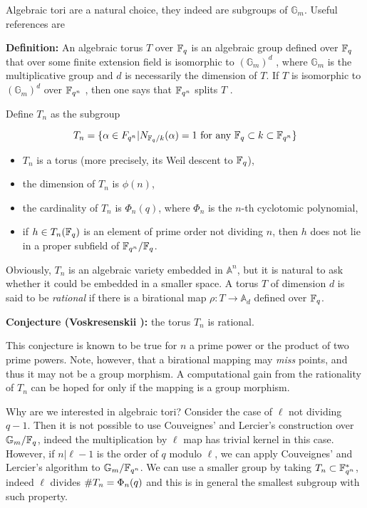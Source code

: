 \documentclass[11pt]{article}
\begin{document}
Algebraic tori are a natural choice, they indeed are subgroups of
$\mathbb{G}_m$. Useful references are
\cite{rubin+silverberg03,rubin-silverberg+crypto03}

\textbf{Definition:} An algebraic torus $T$ over $\mathbb{F}_q$ is an
algebraic group defined over $\mathbb{F}_q$ that over some finite extension
field is isomorphic to $(\mathbb{G}_m)^d$ , where $\mathbb{G}_m$ is
the multiplicative group and $d$ is necessarily the dimension of
$T$. If $T$ is isomorphic to $(\mathbb{G}_m)^d$ over $\mathbb{F}_{q^n}$ , then
one says that $\mathbb{F}_{q^n}$ splits $T$ .

Define $T_n$ as the subgroup 

\begin{equation}
  T_n = \{\alpha \in F_{q^n} | N_{\mathbb{F}_q/k}(\alpha) = 1 \text{ for any } \mathbb{F}_q\subset k\subset\mathbb{F}_{q^n}\}
\end{equation}

\begin{itemize}
\item $T_n$ is a torus (more precisely, its Weil descent to $\mathbb{F}_q$),
\item the dimension of $T_n$ is $\phi(n)$,
\item the cardinality of $T_n$ is $\Phi_n(q)$, where $\Phi_n$ is the
  $n$-th cyclotomic polynomial,
\item if $h\in T_n(\mathbb{F}_q)$ is an element of prime order not dividing
  $n$, then $h$ does not lie in a proper subfield of $\mathbb{F}_{q^n}/\mathbb{F}_q$.
\end{itemize}

Obviously, $T_n$ is an algebraic variety embedded in $\mathbb{A}^n$,
but it is natural to ask whether it could be embedded in a smaller
space. A torus $T$ of dimension $d$ is said to be \emph{rational} if
there is a birational map $\rho : T\to \mathbb{A}_d$ defined over
$\mathbb{F}_q$.

\textbf{Conjecture (Voskresenskii \cite{voskresenskii98}):} the torus
$T_n$ is rational.

This conjecture is known to be true for $n$ a prime power or the
product of two prime powers. Note, however, that a birational mapping
may \emph{miss} points, and thus it may not be a group morphism. A
computational gain from the rationality of $T_n$ can be hoped for only
if the mapping is a group morphism.

Why are we interested in algebraic tori? Consider the case of $\ell$
not dividing $q-1$. Then it is not possible to use Couveignes' and
Lercier's construction over $\mathbb{G}_m/\mathbb{F}_q$, indeed the
multiplication by $\ell$ map has trivial kernel in this case. However,
if $n|\ell-1$ is the order of $q$ modulo $\ell$, we can apply
Couveignes' and Lercier's algorithm to $\mathbb{G}_m/\mathbb{F}_{q^n}$. We can
use a smaller group by taking $T_n\subset\mathbb{F}_{q^n}^\ast$, indeed $\ell$
divides $\# T_n=\Phi_n(q)$ and this is in general the smallest
subgroup with such property.
    
\end{document}
